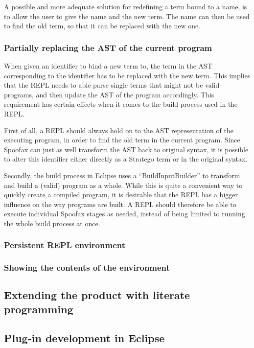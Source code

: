 A possible and more adequate solution for redefining a term bound to a
name, is to allow the user to give the name and the new term. The name
can then be used to find the old term, so that it can be replaced with
the new one.

\subsubsection{Partially replacing the AST of the current program}
When given an identifier to bind a new term to, the term in the AST
corresponding to the identifier has to be replaced with the new term.
This implies that the REPL needs to able parse single terms that might
not be valid programs, and then update the AST of the program accordingly.
This requirement has certain effects when it comes to the build process
used in the REPL.

First of all, a REPL should always hold on to the AST representation of the
executing program, in order to find the old term in the current program.
Since Spoofax can just as well transform the AST back to original syntax,
it is possible to alter this identifier either directly as a Stratego term or
in the original syntax.

Secondly, the build process in Eclipse uses a ``BuildInputBuilder'' to
transform and build a (valid) program as a whole. While this is quite
a convenient way to quickly create a compiled program, it is desirable
that the REPL has a bigger influence on the way programs are built. A
REPL should therefore be able to execute individual Spoofax stages as
needed, instead of being limited to running the whole build process at
once.

\subsubsection{Persistent REPL environment}
\label{sec:pers-repl-envir}

\subsubsection{Showing the contents of the environment}
\label{sec:show-cont-envir}

\subsection{Extending the product with literate programming}
\label{sec:extend-prod-with}

\subsection{Plug-in development in Eclipse}
\label{ssec:eclipse-plugins}

